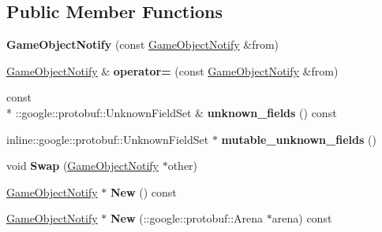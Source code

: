 \subsection*{Public Member Functions}
\begin{DoxyCompactItemize}
\item 
\hypertarget{class_game_object_notify_af06e2a782b8a599555ba395d3dec804f}{{\bfseries Game\-Object\-Notify} (const \hyperlink{class_game_object_notify}{Game\-Object\-Notify} \&from)}\label{class_game_object_notify_af06e2a782b8a599555ba395d3dec804f}

\item 
\hypertarget{class_game_object_notify_ab1951c4b4e75f13c67646b445d526863}{\hyperlink{class_game_object_notify}{Game\-Object\-Notify} \& {\bfseries operator=} (const \hyperlink{class_game_object_notify}{Game\-Object\-Notify} \&from)}\label{class_game_object_notify_ab1951c4b4e75f13c67646b445d526863}

\item 
\hypertarget{class_game_object_notify_a8d2d6ccfc91cd27a05fcc9e97534cc50}{const \\*
\-::google\-::protobuf\-::\-Unknown\-Field\-Set \& {\bfseries unknown\-\_\-fields} () const }\label{class_game_object_notify_a8d2d6ccfc91cd27a05fcc9e97534cc50}

\item 
\hypertarget{class_game_object_notify_aafb21632fce77e41d8b2e9cf723df223}{inline\-::google\-::protobuf\-::\-Unknown\-Field\-Set $\ast$ {\bfseries mutable\-\_\-unknown\-\_\-fields} ()}\label{class_game_object_notify_aafb21632fce77e41d8b2e9cf723df223}

\item 
\hypertarget{class_game_object_notify_ab4cd82478c332a44e03c65249a717ebb}{void {\bfseries Swap} (\hyperlink{class_game_object_notify}{Game\-Object\-Notify} $\ast$other)}\label{class_game_object_notify_ab4cd82478c332a44e03c65249a717ebb}

\item 
\hypertarget{class_game_object_notify_ab6e37de74e40079ef7b30f0291b93220}{\hyperlink{class_game_object_notify}{Game\-Object\-Notify} $\ast$ {\bfseries New} () const }\label{class_game_object_notify_ab6e37de74e40079ef7b30f0291b93220}

\item 
\hypertarget{class_game_object_notify_a338c9aaf5767581cf0ccbe566a22cd03}{\hyperlink{class_game_object_notify}{Game\-Object\-Notify} $\ast$ {\bfseries New} (\-::google\-::protobuf\-::\-Arena $\ast$arena) const }\label{class_game_object_notify_a338c9aaf5767581cf0ccbe566a22cd03}


\end{DoxyCompactItemize}
